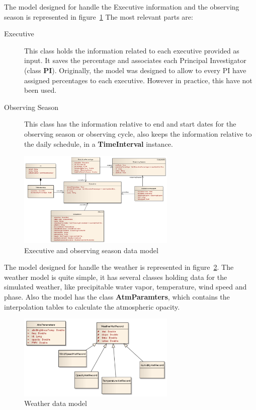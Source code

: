 The model designed for handle the Executive information and the observing season is represented in figure~\ref{fig:datamodel-executive}
The most relevant parts are: 
\begin{description}
\item[Executive] This class holds the information related to each executive provided as input. It saves the percentage and associates each Principal Investigator (class \textbf{PI}). Originally, the model was designed to allow to every PI have assigned percentages to each executive. However in practice, this have not been used.
\item[Observing Season] This class has the information relative to end and start dates for the observing season or observing cycle, also keeps the information relative to the daily schedule, in a \textbf{TimeInterval} instance.
\end{description}

\begin{figure}[htbp]	
\begin{center}
\includegraphics[width=0.67\textwidth]{images/Executive}
\end{center}
\caption{Executive and observing season data model}
\label{fig:datamodel-executive}
\end{figure}

The model designed for handle the weather is represented in figure~\ref{fig:datamodel-weather}. The weather model is quite simple, it has several classes holding data for the simulated weather, like precipitable water vapor, temperature, wind speed and phase. Also the model has the class \textbf{AtmParamters}, which contains the interpolation tables to calculate the atmospheric opacity.

\begin{figure}[htbp]	
\begin{center}
\includegraphics[width=0.67\textwidth]{images/Weather}
\end{center}
\caption{Weather data model}
\label{fig:datamodel-weather}
\end{figure}

